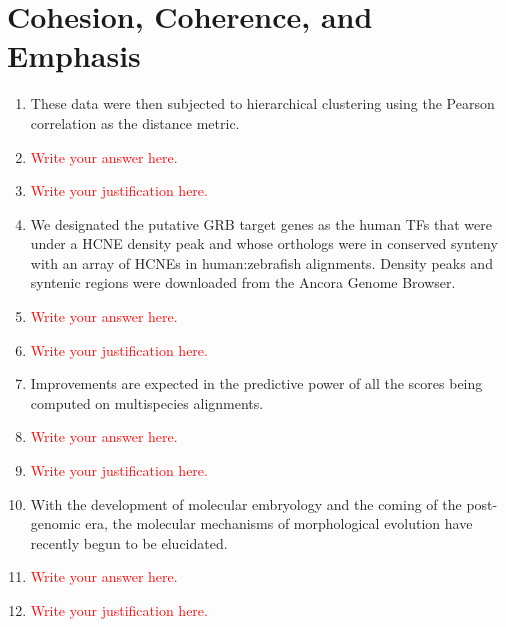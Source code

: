 \documentclass{article}
\newcommand{\red}[1]{\textcolor{red}{#1}}
\begin{document}
\section{Cohesion, Coherence, and Emphasis}

\begin{enumerate}
    \item These data were then subjected to hierarchical clustering using the Pearson correlation as the distance metric.
    \item[] \red{Write your answer here.}
    \item[] \red{Write your justification here.}
    
    \item We designated the putative GRB target genes as the human TFs that were under a HCNE density peak and whose orthologs were in conserved synteny with an array of HCNEs in human:zebrafish alignments. Density peaks and syntenic regions were downloaded from the Ancora Genome Browser.
    \item[] \red{Write your answer here.}
    \item[] \red{Write your justification here.}
    
    \item Improvements are expected in the predictive power of all the scores being computed on multispecies alignments.
    \item[] \red{Write your answer here.}
    \item[] \red{Write your justification here.}

    \item With the development of molecular embryology and the coming of the post-genomic era, the molecular mechanisms of morphological evolution have recently begun to be elucidated.
    \item[] \red{Write your answer here.}
    \item[] \red{Write your justification here.}
    
\end{enumerate}
\end{document}
